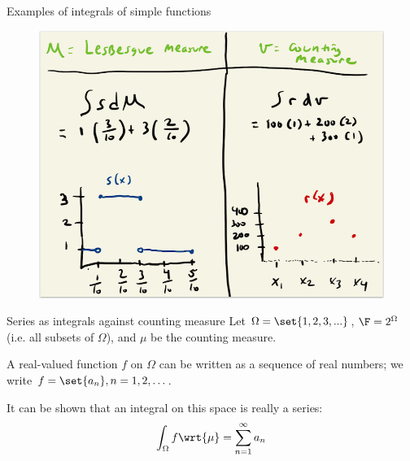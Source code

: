 \documentclass[10pt]{beamer}
\begin{document}
\begin{frame}{Examples of integrals of simple functions}

\begin{figure}[H]
\centering
\includegraphics[width=.9\textwidth]{images/examples_of_integrals_of_simple_functions.png}	
\end{figure}
	
\end{frame}

\begin{frame}{Series as integrals against counting measure} 
Let $\Omega = \set{1,2,3, ...}$, $\F=2^\Omega$ (i.e. all subsets of $\Omega$), and $\mu$ be the counting measure. 

\vfill 

A real-valued function $f$ on $\Omega$ can be written as a sequence of real numbers; we write $f=\set{a_n}, n=1,2, \hdots$.  

\vfill 

It can be shown that an integral on this space is really a series:
%
\begin{align*}
\int_\Omega f \wrt{\mu} = \sum_{n=1}^\infty a_n	
\end{align*}	
\end{frame}
\end{document}
